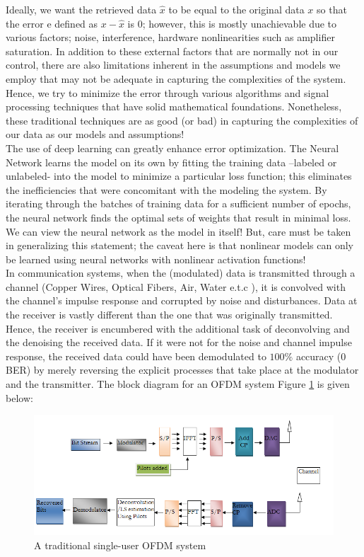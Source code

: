Ideally, we want the retrieved data $\hat{x}$ to be equal to the original data $x$ so that the error e defined as $x-\hat{x}$  is $0$; however, this is mostly unachievable due to various factors; noise, interference, hardware nonlinearities such as amplifier saturation. In addition to these external factors that are normally not in our control, there are also limitations inherent in the assumptions and models we employ that may not be adequate in capturing the complexities of the system. Hence, we try to minimize the error through various algorithms and signal processing techniques that have solid mathematical foundations. Nonetheless, these traditional techniques are as good (or bad) in capturing the complexities of our data as our models and assumptions! \\
The use of deep learning can greatly enhance error optimization. The Neural Network learns the model on its own by fitting the training data –labeled or unlabeled- into the model to minimize a particular loss function; this eliminates the inefficiencies that were concomitant with the modeling the system. By iterating through the batches of training data for a sufficient number of epochs, the neural network finds the optimal sets of weights that result in minimal loss. We can view the neural network as the model in itself! But, care must be taken in generalizing this statement; the caveat here is that nonlinear models can only be learned using neural networks with nonlinear activation functions!\\
In communication systems, when the (modulated) data is transmitted through a channel (Copper Wires, Optical Fibers, Air, Water e.t.c ), it is convolved with the channel’s impulse response and corrupted by noise and disturbances. Data at the receiver is vastly different than the one that was originally transmitted. Hence, the receiver is encumbered with the additional task of deconvolving and the denoising the received data. If it were not for the noise and channel impulse response, the received data could have been demodulated to $100\%$ accuracy ($0$ BER) by merely reversing the explicit processes that take place at the modulator and the transmitter. The block diagram for an OFDM system Figure \ref{fig:trad_ofdm} is given below: \\
\begin{figure}[htbp]
  \centering
  \includegraphics[width=\textwidth]{./Figures/trad_ofdm.png}
  \caption{A traditional single-user OFDM system}
  \label{fig:trad_ofdm}
\end{figure}
